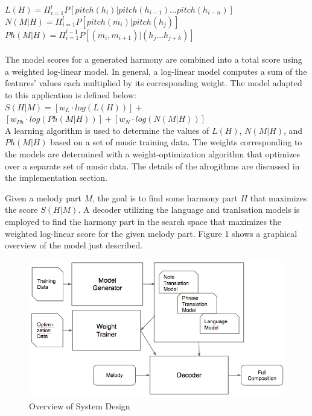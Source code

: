 \documentclass{sig-alternate}
\begin{document}
$L(H) = \Pi_{i = 1}^{l} P[pitch(h_{i}) | pitch(h_{i - 1}) \ldots pitch(h_{i - n})]$\\

$N(M | H) = \Pi_{i = 1}^{l} P[pitch(m_{i}) | pitch(h_{j})]$\\

$Ph(M | H) = \Pi_{i = 1}^{l - 1} P[(m_{i}, m_{i + 1}) | (h_{j} \ldots h_{j + k})]$\\
\\

The model scores for a generated harmony are combined into a total score using a weighted log-linear model. In general, a log-linear model computes a sum of the features' values each multiplied by its corresponding weight. The model adapted to this application is defined below:\\

$S(H | M) = [w_{L}\cdot log(L(H))] + $\\

$[w_{Ph}\cdot log(Ph(M | H))] + [w_{N}\cdot log(N(M | H))]$\\

A learning algorithm is used to determine the values of $L(H)$, $N(M | H)$, and $Ph(M | H)$ based on a set of music training data. The weights corresponding to the models are determined with a weight-optimization algorithm that optimizes over a separate set of music data. The details of the alrogithms are discussed in the implementation section.

Given a melody part $M$, the goal is to find some harmony part $H$ that maximizes the score $S(H | M)$.
A decoder utilizing  the language and tranlsation models is employed to find the harmony part in the search space that maximizes the weighted log-linear score for the given melody part. Figure 1 shows a graphical overview of the model just described.
\begin{figure}
\includegraphics[scale=0.3]{images/system_design.png}
\caption{Overview of System Design}
\end{figure}
\end{document}
